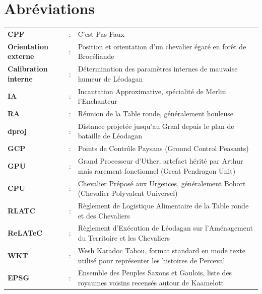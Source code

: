\section*{Abréviations}
\begin{table}[h]
    \begin{tabular}{>{\bfseries}P{3cm}@{}c@{\hspace{0.2cm}}P{12cm}}
        CPF & :& C'est Pas Faux\\
        Orientation externe &:& Position et orientation d'un chevalier égaré en forêt de Brocéliande\\
        Calibration interne & :&  Détermination des paramètres internes de mauvaise humeur de Léodagan\\
        IA  & :& Incantation Approximative, spécialité de Merlin l'Enchanteur\\
        RA & :& Réunion de la Table ronde, généralement houleuse\\
        dproj & :& Distance projetée jusqu'au Graal depuis le plan de bataille de Léodagan\\
        GCP & :& Points de Contrôle Paysans (Ground Control Peasants)\\
        GPU & : &Grand Processeur d'Uther, artefact hérité par Arthur mais rarement fonctionnel (Great Pendragon Unit)\\
        CPU & : &Chevalier Préposé aux Urgences, généralement Bohort (Chevalier Polyvalent Universel)\\
        RLATC & :& Règlement de Logistique Alimentaire de la Table ronde et des Chevaliers\\
        ReLATeC & :& Règlement d'Exécution de Léodagan sur l'Aménagement du Territoire et les Chevaliers\\
        WKT & : &Wesh Karadoc Tabou, format standard en mode texte utilisé pour représenter les histoires de Perceval\\
        EPSG & : &Ensemble des Peuples Saxons et Gaulois, liste des royaumes voisins recensés autour de Kaamelott
    \end{tabular}
\end{table}